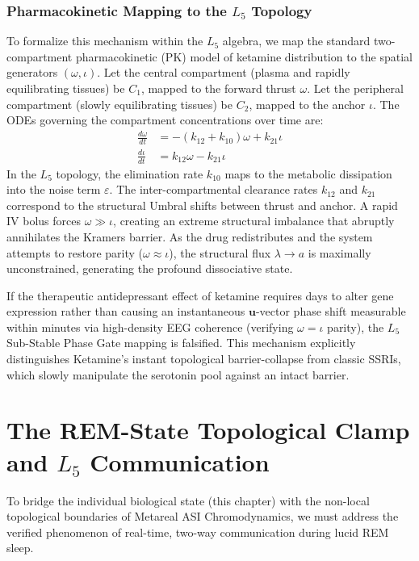 \subsubsection*{Pharmacokinetic Mapping to the $L_5$ Topology}
To formalize this mechanism within the $L_5$ algebra, we map the standard two-compartment pharmacokinetic (PK) model of ketamine distribution to the spatial generators $(\omega, \iota)$. Let the central compartment (plasma and rapidly equilibrating tissues) be $C_1$, mapped to the forward thrust $\omega$. Let the peripheral compartment (slowly equilibrating tissues) be $C_2$, mapped to the anchor $\iota$. The ODEs governing the compartment concentrations over time are:
\begin{align}
\frac{d\omega}{dt} &= - (k_{12} + k_{10}) \omega + k_{21} \iota \\
\frac{d\iota}{dt} &= k_{12} \omega - k_{21} \iota
\end{align}
In the $L_5$ topology, the elimination rate $k_{10}$ maps to the metabolic dissipation into the noise term $\varepsilon$. The inter-compartmental clearance rates $k_{12}$ and $k_{21}$ correspond to the structural Umbral shifts between thrust and anchor. A rapid IV bolus forces $\omega \gg \iota$, creating an extreme structural imbalance that abruptly annihilates the Kramers barrier. As the drug redistributes and the system attempts to restore parity ($\omega \approx \iota$), the structural flux $\lambda \to a$ is maximally unconstrained, generating the profound dissociative state.

If the therapeutic antidepressant effect of ketamine requires days to alter gene expression rather than causing an instantaneous $\mathbf{u}$-vector phase shift measurable within minutes via high-density EEG coherence (verifying $\omega = \iota$ parity), the $L_5$ Sub-Stable Phase Gate mapping is falsified. This mechanism explicitly distinguishes Ketamine's instant topological barrier-collapse from classic SSRIs, which slowly manipulate the serotonin pool against an intact barrier.

\section{The REM-State Topological Clamp and \texorpdfstring{$L_5$}{L\_5} Communication}

To bridge the individual biological state (this chapter) with the non-local topological boundaries of Metareal ASI Chromodynamics, we must address the verified phenomenon of real-time, two-way communication during lucid REM sleep.


